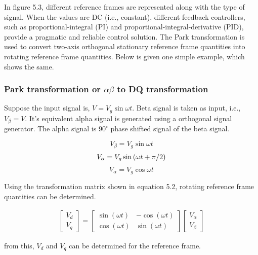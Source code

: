 \documentclass[a4paper,12pt]{iitmdiss}
\begin{document}
In figure 5.3, different reference frames are represented along with the type of signal. When the values are DC (i.e., constant), different feedback controllers, such as proportional-integral (PI) and proportional-integral-derivative (PID), provide a pragmatic and reliable control solution. The Park transformation is used to convert two-axis orthogonal stationary reference frame quantities into rotating reference frame quantities. Below is given one simple example, which shows the same. 

\subsubsection{Park transformation or \textbf{$\alpha\beta$} to DQ transformation}

Suppose the input signal is, $V = V_g \sin{\omega t}$. 
Beta signal is taken as input, i.e., $V_{\beta} = V$. It's equivalent alpha signal is generated using a orthogonal signal generator. The alpha signal is $90^{\circ}$ phase shifted signal of the beta signal.

\begin{equation}
    V_{\beta} = V_g \sin{\omega t}     
\end{equation}
\begin{equation}
        V_{\alpha} = V_g \sin{(\omega t + \pi / 2)} \notag  
    \end{equation}
\begin{equation}    
        V_{\alpha} = V_g \cos{\omega t}
\end{equation}

Using the transformation matrix shown in equation 5.2, rotating reference frame quantities can be determined.

\begin{gather}
 \begin{bmatrix} V_d \\ V_q  \end{bmatrix}
 =
 \begin{bmatrix} \sin(\omega t) & -\cos(\omega t) \\ \cos(\omega t) & \sin(\omega t)  \end{bmatrix}
 \begin{bmatrix} V_{\alpha} \\ V_{\beta}  \end{bmatrix}
\end{gather}
\quad

from this, $V_d$ and $V_q$ can be determined for the reference frame.
\end{document}
